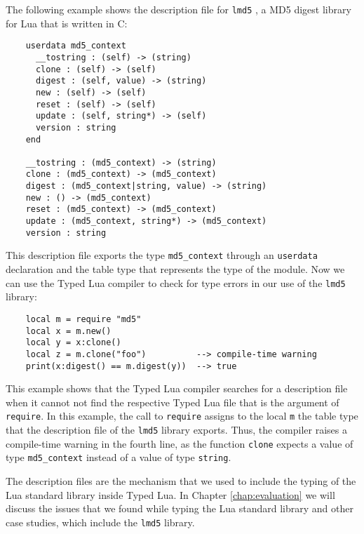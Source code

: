 The following example shows the description file for \texttt{lmd5} \citep{lmd5},
a MD5 digest library for Lua that is written in C:
\begin{verbatim}
    userdata md5_context
      __tostring : (self) -> (string)
      clone : (self) -> (self)
      digest : (self, value) -> (string)
      new : (self) -> (self)
      reset : (self) -> (self)
      update : (self, string*) -> (self)
      version : string
    end

    __tostring : (md5_context) -> (string)
    clone : (md5_context) -> (md5_context)
    digest : (md5_context|string, value) -> (string)
    new : () -> (md5_context)
    reset : (md5_context) -> (md5_context)
    update : (md5_context, string*) -> (md5_context)
    version : string
\end{verbatim}

This description file exports the type \texttt{md5\string_context}
through an \texttt{userdata} declaration and the table type that
represents the type of the module.
Now we can use the Typed Lua compiler to check for type errors in
our use of the \texttt{lmd5} library:
\begin{verbatim}
    local m = require "md5"
    local x = m.new()
    local y = x:clone()
    local z = m.clone("foo")          --> compile-time warning
    print(x:digest() == m.digest(y))  --> true
\end{verbatim}

This example shows that the Typed Lua compiler searches for a
description file when it cannot not find the respective Typed Lua file
that is the argument of \texttt{require}.
In this example, the call to \texttt{require} assigns to the local
\texttt{m} the table type that the description file of the \texttt{lmd5}
library exports. 
Thus, the compiler raises a compile-time warning in the fourth line,
as the function \texttt{clone} expects a value of type
\texttt{md5\string_context} instead of a value of type \texttt{string}.

The description files are the mechanism that we used to include the
typing of the Lua standard library inside Typed Lua.
In Chapter \ref{chap:evaluation} we will discuss the issues that we
found while typing the Lua standard library and other case studies,
which include the \texttt{lmd5} library. 

